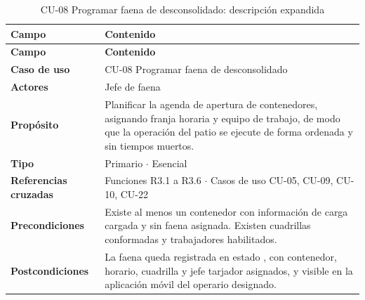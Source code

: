 {\estilotabla
\begin{longtable}{L{0.25\textwidth} L{0.69\textwidth}}

\caption{CU-08 Programar faena de desconsolidado: descripción expandida}
\label{tab:cu08_desc}
\\

\toprule
\textbf{Campo} & \textbf{Contenido} \\
\midrule
\endfirsthead

\toprule
\textbf{Campo} & \textbf{Contenido} \\
\midrule
\endhead

\textbf{Caso de uso} & CU-08 Programar faena de desconsolidado \\
\midrule
\textbf{Actores} & Jefe de faena  \\
\midrule
\textbf{Propósito} & Planificar la agenda de apertura de contenedores, asignando franja horaria y
equipo de trabajo, de modo que la operación del patio se ejecute de forma ordenada y sin tiempos
muertos. \\
\midrule
\textbf{Tipo} & Primario $\cdot$ Esencial \\
\midrule
\textbf{Referencias cruzadas} & Funciones R3.1 a R3.6 $\cdot$ Casos de uso CU-05, CU-09, CU-10,
CU-22 \\
\midrule
\textbf{Precondiciones} & Existe al menos un contenedor con información de carga cargada y sin
faena asignada. Existen cuadrillas conformadas y trabajadores habilitados. \\
\midrule
\textbf{Postcondiciones} & La faena queda registrada en estado , con contenedor,
horario, cuadrilla y jefe tarjador asignados, y visible en la aplicación móvil del operario
designado. \\

\bottomrule

\end{longtable}
}

